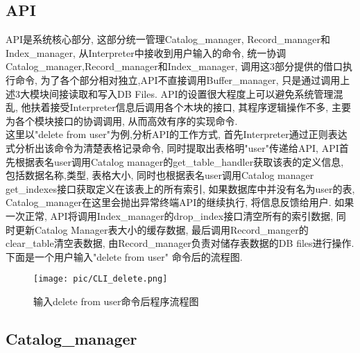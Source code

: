 \documentclass[10pt]{article}
\begin{document}
\begin{CJK}{UTF8}{gkai}
	\subsection{API}
API是系统核心部分, 这部分统一管理Catalog\_manager, Record\_manager和Index\_manager, 从Interpreter中接收到用户输入的命令, 统一协调Catalog\_manager,Record\_manager和Index\_manager, 调用这3部分提供的借口执行命令, 为了各个部分相对独立,API不直接调用Buffer\_manager, 只是通过调用上述3大模块间接读取和写入DB Files. 
API的设置很大程度上可以避免系统管理混乱, 他扶着接受Interpreter信息后调用各个木块的接口, 其程序逻辑操作不多, 主要为各个模块接口的协调调用, 从而高效有序的实现命令.
\\
这里以"delete from user"为例,分析API的工作方式, 首先Interpreter通过正则表达式分析出该命令为清楚表格记录命令, 同时提取出表格明"user"传递给API, API首先根据表名user调用Catalog manager的get\_table\_handler获取该表的定义信息, 包括数据名称,类型, 表格大小, 同时也根据表名user调用Catalog manager get\_indexes接口获取定义在该表上的所有索引, 如果数据库中并没有名为user的表, Catalog\_manager在这里会抛出异常终端API的继续执行, 将信息反馈给用户. 如果一次正常, API将调用Index\_manager的drop\_index接口清空所有的索引数据, 同时更新Catalog Manager表大小的缓存数据, 最后调用Record\_manger的clear\_table清空表数据, 由Record\_manager负责对储存表数据的DB files进行操作. 下面是一个用户输入"delete from user" 命令后的流程图.
\begin{figure}[H]
	\begin{center}
		\texttt{[image: pic/CLI\_delete.png]}
		\caption{输入delete from user命令后程序流程图}
	\end{center}
\end{figure}

		\subsection{Catalog\_manager}

\end{CJK}
\end{document}

